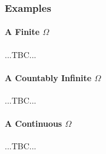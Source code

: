 





\subsubsection{Examples}

\paragraph{A Finite $\Omega$} ...TBC...

\paragraph{A Countably Infinite $\Omega$} ...TBC...

\paragraph{A Continuous $\Omega$} ...TBC...






